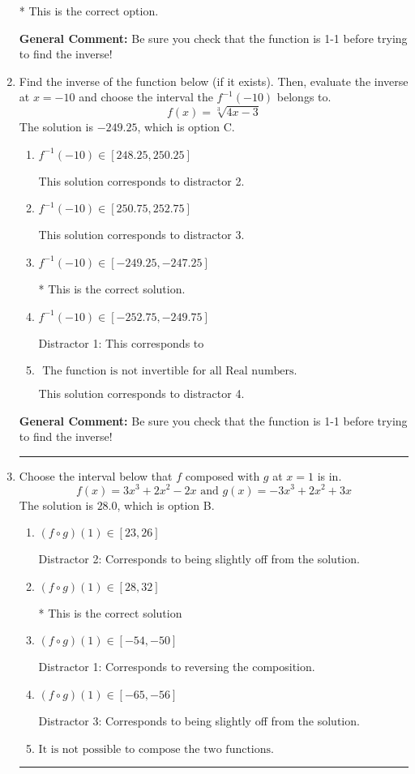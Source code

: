 \documentclass{extbook}[14pt]
\newcommand{\litem}[1]{\item #1

\rule{\textwidth}{0.4pt}}
\begin{document}
\begin{enumerate}
{\begin{enumerate}[label=\Alph*.]
* This is the correct option.
\end{enumerate}

\textbf{General Comment:} Be sure you check that the function is 1-1 before trying to find the inverse!
}
\litem{
Find the inverse of the function below (if it exists). Then, evaluate the inverse at $x = -10$ and choose the interval the $f^{-1}(-10)$ belongs to.
\[ f(x) = \sqrt[3]{4 x - 3} \]The solution is \( -249.25 \), which is option C.\begin{enumerate}[label=\Alph*.]
\item \( f^{-1}(-10) \in [248.25, 250.25] \)

 This solution corresponds to distractor 2.
\item \( f^{-1}(-10) \in [250.75, 252.75] \)

 This solution corresponds to distractor 3.
\item \( f^{-1}(-10) \in [-249.25, -247.25] \)

* This is the correct solution.
\item \( f^{-1}(-10) \in [-252.75, -249.75] \)

 Distractor 1: This corresponds to 
\item \( \text{ The function is not invertible for all Real numbers. } \)

 This solution corresponds to distractor 4.
\end{enumerate}

\textbf{General Comment:} Be sure you check that the function is 1-1 before trying to find the inverse!
}
\litem{
Choose the interval below that $f$ composed with $g$ at $x=1$ is in.
\[ f(x) = 3x^{3} +2 x^{2} -2 x \text{ and } g(x) = -3x^{3} +2 x^{2} +3 x \]The solution is \( 28.0 \), which is option B.\begin{enumerate}[label=\Alph*.]
\item \( (f \circ g)(1) \in [23, 26] \)

 Distractor 2: Corresponds to being slightly off from the solution.
\item \( (f \circ g)(1) \in [28, 32] \)

* This is the correct solution
\item \( (f \circ g)(1) \in [-54, -50] \)

 Distractor 1: Corresponds to reversing the composition.
\item \( (f \circ g)(1) \in [-65, -56] \)

 Distractor 3: Corresponds to being slightly off from the solution.
\item \( \text{It is not possible to compose the two functions.} \)



\end{enumerate}}
\end{enumerate}
\end{document}
